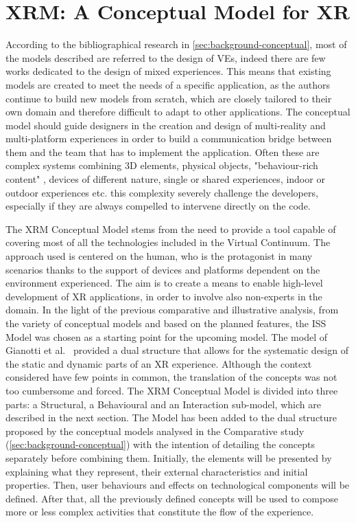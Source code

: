 \chapter{XRM: A Conceptual Model for XR}
\label{ch:conceptual-model}

According to the bibliographical research in \autoref{sec:background-conceptual}, most of the models described are referred to the design of VEs, indeed there are few works dedicated to the design of mixed experiences. This means that existing models are created to meet the needs of a specific application, as the authors continue to build new models from scratch, which are closely tailored to their own domain and therefore difficult to adapt to other applications. The conceptual model should guide designers in the creation and design of multi-reality and multi-platform experiences in order to build a communication bridge between them and the team that has to implement the application. Often these are complex systems combining 3D elements, physical objects, "behaviour-rich content" \cite{walczak_structured_2008}, devices of different nature, single or shared experiences, indoor or outdoor experiences etc. this complexity severely challenge the developers, especially if they are always compelled to intervene directly on the code. 

The XRM Conceptual Model stems from the need to provide a tool capable of covering most of all the technologies included in the Virtual Continuum. The approach used is centered on the human, who is the protagonist in many scenarios thanks to the support of devices and platforms dependent on the environment experienced. The aim is to create a means to enable high-level development of XR applications, in order to involve also non-experts in the domain. 
In the light of the previous comparative and illustrative analysis, from the variety of conceptual models and based on the planned features, the ISS Model was chosen as a starting point for the upcoming model. The model of Gianotti et al.~\cite{dobbie_modeling_2020} provided a dual structure that allows for the systematic design of the static and dynamic parts of an XR experience. Although the context considered have few points in common, the translation of the concepts was not too cumbersome and forced. The XRM Conceptual Model is divided into three parts: a Structural, a Behavioural and an Interaction sub-model, which are described in the next section. 
The Model has been added to the dual structure proposed by the conceptual models analysed in the Comparative study (\autoref{sec:background-conceptual}) with the intention of detailing the concepts separately before combining them. Initially, the elements will be presented by explaining what they represent, their external characteristics and initial properties. Then, user behaviours and effects on technological components will be defined. After that, all the previously defined concepts will be used to compose more or less complex activities that constitute the flow of the experience.





